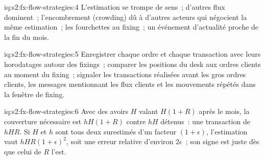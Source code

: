 \begin{solution}{iq:s2:fx-flow-strategies:4}
L'estimation se trompe de sens~; d'autres flux dominent~; l'encombrement (crowding) dû à d'autres acteurs qui négocient la même estimation~; les fourchettes au fixing~; un événement d'actualité proche de la fin du mois.
\end{solution}

\begin{solution}{iq:s2:fx-flow-strategies:5}
Enregistrer chaque ordre et chaque transaction avec leurs horodatages autour des fixings~; comparer les positions du desk aux ordres clients au moment du fixing~; signaler les transactions réalisées avant les gros
ordres clients, les messages mentionnant les flux clients et les mouvements répétés dans la fenêtre de fixing.
\end{solution}

\begin{solution}{iq:s2:fx-flow-strategies:6}
Avec des avoirs $H$ valant $H(1 + R)$ après le mois, la couverture nécessaire est $hH(1 + R)$ contre $hH$ détenus~: une transaction de $hHR$. Si $H$ et $h$ sont tous deux
surestimés d'un facteur $(1 + \epsilon)$, l'estimation vaut $hHR(1 + \epsilon)^2$, soit une erreur relative d'environ $2\epsilon$~; son signe est juste dès que
celui de $R$ l'est.
\end{solution}
